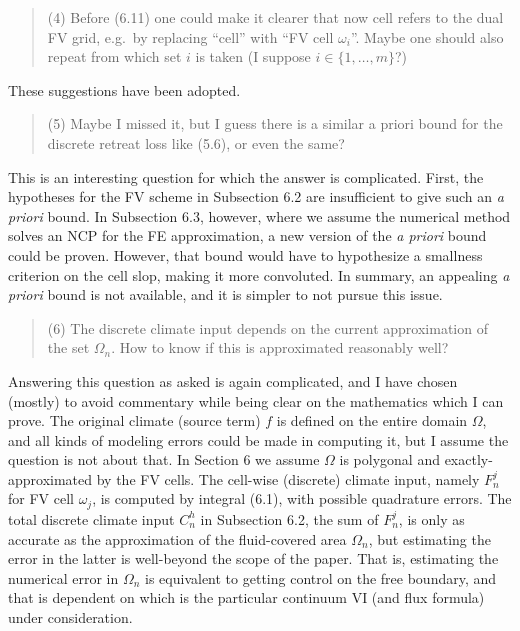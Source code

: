 \documentclass[12pt]{amsart}
\newcommand{\mm}{\medskip \noindent}
\begin{document}
\begin{quote}
\mm (4) Before (6.11) one could make it clearer that now cell refers to the dual FV grid, e.g.~by replacing ``cell'' with ``FV cell $\omega_i$''.  Maybe one should also repeat from which set $i$ is taken (I suppose $i \in \{1,\dots,m\}$?)
\end{quote}

These suggestions have been adopted.

\begin{quote}
\mm (5) Maybe I missed it, but I guess there is a similar a priori bound for the discrete retreat loss like (5.6), or even the same?
\end{quote}

This is an interesting question for which the answer is complicated.  First, the hypotheses for the FV scheme in Subsection 6.2 are insufficient to give such an \emph{a priori} bound.  In Subsection 6.3, however, where we assume the numerical method solves an NCP for the FE approximation, a new version of the \emph{a priori} bound could be proven.  However, that bound would have to hypothesize a smallness criterion on the cell slop, making it more convoluted.  In summary, an appealing \emph{a priori} bound is not available, and it is simpler to not pursue this issue.

\begin{quote}
\mm (6) The discrete climate input depends on the current approximation of the set $\Omega_n$.  How to know if this is approximated reasonably well?
\end{quote}

Answering this question as asked is again complicated, and I have chosen (mostly) to avoid commentary while being clear on the mathematics which I can prove.  The original climate (source term) $f$ is defined on the entire domain $\Omega$, and all kinds of modeling errors could be made in computing it, but I assume the question is not about that.  In Section 6 we assume $\Omega$ is polygonal and exactly-approximated by the FV cells.  The cell-wise (discrete) climate input, namely $F_n^j$ for FV cell $\omega_j$, is computed by integral (6.1), with possible quadrature errors.  The total discrete climate input $C_n^h$ in Subsection 6.2, the sum of $F_n^j$, is only as accurate as the approximation of the fluid-covered area $\Omega_n$, but estimating the error in the latter is well-beyond the scope of the paper.  That is, estimating the numerical error in $\Omega_n$ is equivalent to getting control on the free boundary, and that is dependent on which is the particular continuum VI (and flux formula) under consideration.
\end{document}
